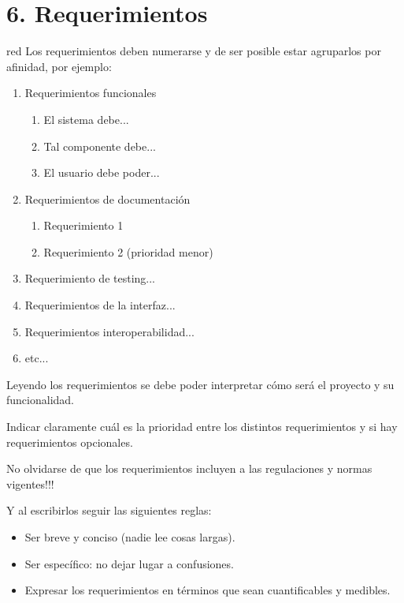 \documentclass[
11pt, %
codirector, %
]{charter}
\begin{document}
\section{6. Requerimientos}
\label{sec:requerimientos}

\begin{consigna}{red}
Los requerimientos deben numerarse y de ser posible estar agruparlos por afinidad, por ejemplo:

\begin{enumerate}
	\item Requerimientos funcionales
		\begin{enumerate}
			\item El sistema debe...
			\item Tal componente debe...
			\item El usuario debe poder...
		\end{enumerate}
	\item Requerimientos de documentación
		\begin{enumerate}
			\item Requerimiento 1
			\item Requerimiento 2 (prioridad menor)
		\end{enumerate}
	\item Requerimiento de testing...
	\item Requerimientos de la interfaz...
	\item Requerimientos interoperabilidad...
	\item etc...
\end{enumerate}

Leyendo los requerimientos se debe poder interpretar cómo será el proyecto y su funcionalidad.

Indicar claramente cuál es la prioridad entre los distintos requerimientos y si hay requerimientos opcionales. 

No olvidarse de que los requerimientos incluyen a las regulaciones y normas vigentes!!!

Y al escribirlos seguir las siguientes reglas:
\begin{itemize}
	\item Ser breve y conciso (nadie lee cosas largas). 
	\item Ser específico: no dejar lugar a confusiones.
	\item Expresar los requerimientos en términos que sean cuantificables y medibles.
\end{itemize}

\end{consigna}
\end{document}
